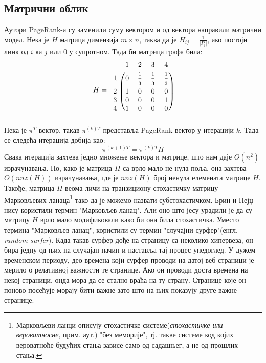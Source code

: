         \subsection{Матрични облик} 
		Аутори  PageRank-а су заменили суму вектором и од вектора направили матрични модел. Нека је $H$ матрица димензија $m\times n$, таква да је $H_{ij}=\frac{1}{\left |P_{i}  \right |}$, ако постоји линк од $i$ ка $j$ или $0$ у супротном. Тада би матрица графа била: 
\[
H=
\begin{blockarray}{ccccc}
& 1 & 2 & 3 & 4  \\
\begin{block}{c(cccc)}
  1 & 0 & \frac{\strut 1}{\strut 3} & \frac{\strut 1}{\strut 3} & \frac{\strut 1}{\strut 3}  \\
  2 & 1 & 0 & 0 & 0  \\
  3 & 0 & 0 & 0 & 1  \\
  4 & 1 & 0 & 0 & 0  \\
\end{block}
\end{blockarray}
 \]
        Нека је $\pi^{T}$ вектор, такав $\pi^{(k)T}$ представља PageRank вектор у итерацији $k$. Тада се следећа итерација добија као:
        \begin{equation}
        \pi^{(k+1) T}=\pi^{(k)T}H
        \end{equation}
        Свака итерација захтева једно множење вектора и матрице, што нам даје $O(n^{2})$ израчунавања. Но, како је матрица $H$ са врло мало не-нула поља, она захтева $O(nnz(H))$ израчунавања, где је $nnz(H)$ број ненула елемената матрице $H$. Такође, матрица $H$ веома личи на транзициону стохастичку матрицу Марковљевих ланаца\footnote{Марковљеви ланци описују стохастичке системе(\emph{стохастичке или вероватносне}, прим. аут.) "без меморије", тј. такве системе код којих вероватноће будућих стања зависе само од садашњег, а не од прошлих стања.\cite{filipovic2006operatori}} тако да је можемо назвати субстохастичком\cite[Ch 4.2]{langville2011google}. Брин и Пејџ нису користили термин "Марковљев ланац". Али оно што јесу урадили је да су матрицу $H$ врло мало модификовали како би она била стохастичка. Уместо термина "Марковљев ланац", користили су термин "случајни сурфер"(енгл. \emph{random surfer}). Када такав сурфер дође на страницу са неколико хипервеза, он бира једну од њих на случајан начин и наставља тај процес унедоглед. У дужем временском периоду, део времена који сурфер проводи на датој веб страници је мерило о релативној важности те странице. Ако он проводи доста времена на некој страници, онда мора да се стално враћа на ту страну. Странице које он поново посећује морају бити важне зато што на њих показују друге важне странице.\\
